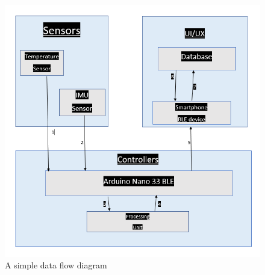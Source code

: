 \begin{figure}[h!]
	\centering
 	\includegraphics[width=\textwidth]{images/data flow}
 \caption{A simple data flow diagram}
\end{figure}